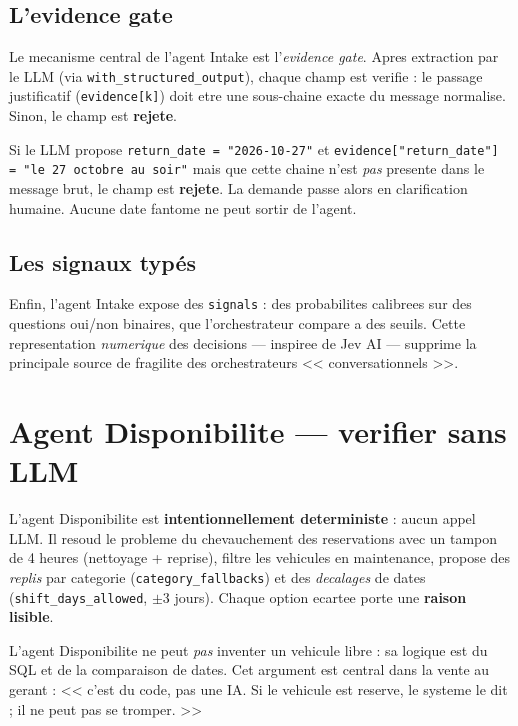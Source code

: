 \documentclass[12pt,a4paper,openany]{report}
\begin{document}
\subsection{L'evidence gate}
Le mecanisme central de l'agent Intake est l'\emph{evidence gate}. Apres extraction par le LLM (via \texttt{with\_structured\_output}), chaque champ est verifie : le passage justificatif (\texttt{evidence[k]}) doit etre une sous-chaine exacte du message normalise. Sinon, le champ est \textbf{rejete}.

\begin{alertbox}
Si le LLM propose \texttt{return\_date = "2026-10-27"} et \texttt{evidence["return\_date"] = "le 27 octobre au soir"} mais que cette chaine n'est \emph{pas} presente dans le message brut, le champ est \textbf{rejete}. La demande passe alors en clarification humaine. Aucune date fantome ne peut sortir de l'agent.
\end{alertbox}

\subsection{Les signaux typés}
Enfin, l'agent Intake expose des \texttt{signals} : des probabilites calibrees sur des questions oui/non binaires, que l'orchestrateur compare a des seuils. Cette representation \emph{numerique} des decisions --- inspiree de Jev AI --- supprime la principale source de fragilite des orchestrateurs << conversationnels >>.

\section{Agent Disponibilite --- verifier sans LLM}

L'agent Disponibilite est \textbf{intentionnellement deterministe} : aucun appel LLM. Il resoud le probleme du chevauchement des reservations avec un tampon de 4 heures (nettoyage + reprise), filtre les vehicules en maintenance, propose des \emph{replis} par categorie (\texttt{category\_fallbacks}) et des \emph{decalages} de dates (\texttt{shift\_days\_allowed}, $\pm$3 jours). Chaque option ecartee porte une \textbf{raison lisible}.

\begin{mechanismbox}
L'agent Disponibilite ne peut \emph{pas} inventer un vehicule libre : sa logique est du SQL et de la comparaison de dates. Cet argument est central dans la vente au gerant : << c'est du code, pas une IA. Si le vehicule est reserve, le systeme le dit ; il ne peut pas se tromper. >>
\end{mechanismbox}
\end{document}
